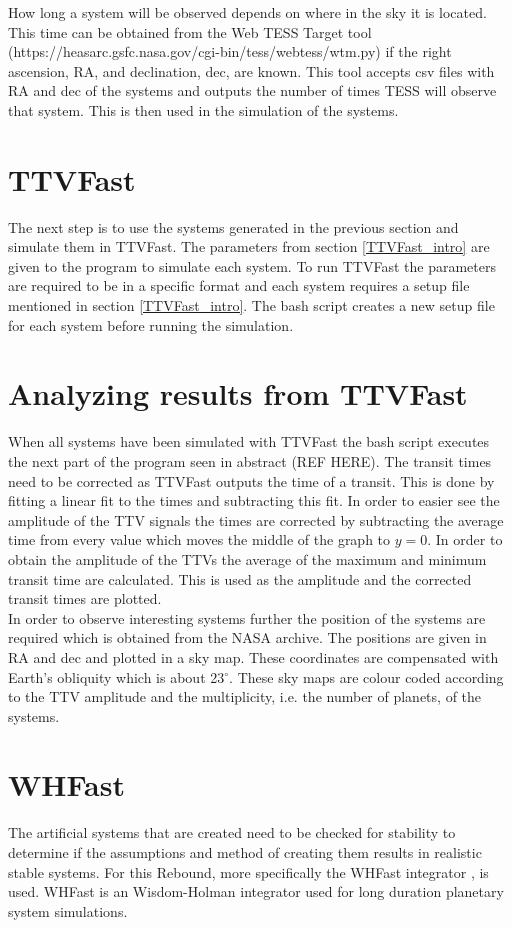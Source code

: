 \documentclass[12pt]{report}
\begin{document}
	How long a system will be observed depends on where in the sky it is located. This time can be obtained from the Web TESS Target tool (https://heasarc.gsfc.nasa.gov/cgi-bin/tess/webtess/wtm.py) if the right ascension, RA, and declination, dec, are known. This tool accepts csv files with RA and dec of the systems and outputs the number of times TESS will observe that system. This is then used in the simulation of the systems.
	

\section{TTVFast}
\label{TTVFast_method}
	The next step is to use the systems generated in the previous section and simulate them in TTVFast. The parameters from section \ref{TTVFast_intro} are given to the program to simulate each system. To run TTVFast the parameters are required to be in a specific format and each system requires a setup file mentioned in section \ref{TTVFast_intro}. The bash script creates a new setup file for each system before running the simulation. 

\section{Analyzing results from TTVFast}
	When all systems have been simulated with TTVFast the bash script executes the next part of the program seen in abstract (REF HERE). The transit times need to be corrected as TTVFast outputs the time of a transit. This is done by fitting a linear fit to the times and subtracting this fit. In order to easier see the amplitude of the TTV signals the times are corrected by subtracting the average time from every value which moves the middle of the graph to $y=0$. In order to obtain the amplitude of the TTVs the average of the maximum and minimum transit time are calculated. This is used as the amplitude and the corrected transit times are plotted. \\
	
	In order to observe interesting systems further the position of the systems are required which is obtained from the NASA archive. The positions are given in RA and dec and plotted in a sky map. These coordinates are compensated with Earth's obliquity which is about 23$^{\circ}$. These sky maps are colour coded according to the TTV amplitude and the multiplicity, i.e. the number of planets, of the systems.
\section{WHFast}
	The artificial systems that are created need to be checked for stability to determine if the assumptions and method of creating them results in realistic stable systems. For this Rebound, more specifically the WHFast integrator \citep{2015MNRAS.452..376R}, is used. WHFast is an Wisdom-Holman integrator used for long duration planetary system simulations. 
\end{document}
